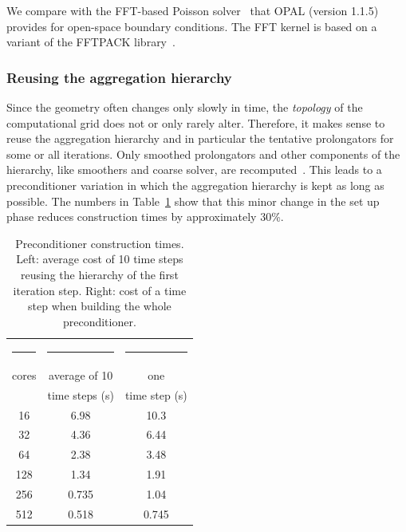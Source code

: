 We compare with the FFT-based Poisson solver~\cite{hoea:88} that
\textsc{OPAL} (version 1.1.5) provides for open-space boundary conditions.  
The FFT kernel is based  on a variant of the FFTPACK library~\cite{FFTPACK, Swar:82}.

\subsubsection*{Reusing the aggregation hierarchy}

Since the geometry often changes only slowly in time, the
\emph{topology} of the computational grid does not or only rarely alter.
Therefore, it makes sense to reuse the aggregation hierarchy and in
particular the tentative prolongators for some or all iterations.  Only
smoothed prolongators and other components of the hierarchy, like
smoothers and coarse solver, are recomputed~\cite[p.16]{gsht:06}.
This leads to a preconditioner variation in which the aggregation
hierarchy is kept as long as possible.  The numbers in
Table~\ref{tbl:timings_reuse_hierarchy} show that this minor change in
the set up phase reduces construction times by approximately 30\%.

\begin{table}[ht]
  \begin{center}
    \begin{tabular}{ccc}
      \hline
      \rule{15mm}{0mm} & \rule{30mm}{0mm} & \rule{30mm}{0mm} \\[-4mm]
      cores & average of 10 & one \\
      &time steps (s) &  time step (s) \\
      \hline
      16  & 6.98 & 10.3 \\
      32  & 4.36 &  6.44 \\
      64  & 2.38 &  3.48 \\
      128 & 1.34 &  1.91 \\ 
      256 & 0.735 &  1.04 \\
      512 & 0.518 &  0.745 \\
      \hline
    \end{tabular}
    \caption{Preconditioner construction times.  Left: average cost of
      10 time steps reusing the hierarchy of the first iteration step.
      Right: cost of a time step when building the whole
      preconditioner.
    }
    \label{tbl:timings_reuse_hierarchy}
  \end{center}
\end{table}

